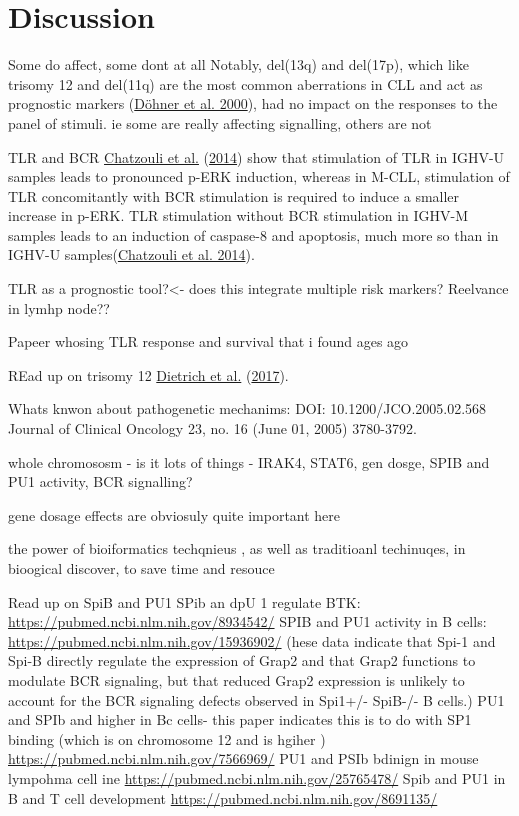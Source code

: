 \documentclass[11pt, a4paper, twosided]{book}
\begin{document}
\hypertarget{discussion-1}{%
\section{Discussion}\label{discussion-1}}

Some do affect, some dont at all
Notably, del(13q) and del(17p), which like trisomy 12 and del(11q) are the most common aberrations in CLL and act as prognostic markers (\protect\hyperlink{ref-Dohner2000}{Döhner et al. 2000}), had no impact on the responses to the panel of stimuli.
ie some are really affecting signalling, others are not

TLR and BCR
\protect\hyperlink{ref-Chatzouli2014}{Chatzouli et al.} (\protect\hyperlink{ref-Chatzouli2014}{2014}) show that stimulation of TLR in IGHV-U samples leads to pronounced p-ERK induction, whereas in M-CLL, stimulation of TLR concomitantly with BCR stimulation is required to induce a smaller increase in p-ERK. TLR stimulation without BCR stimulation in IGHV-M samples leads to an induction of caspase-8 and apoptosis, much more so than in IGHV-U samples(\protect\hyperlink{ref-Chatzouli2014}{Chatzouli et al. 2014}).

TLR as a prognostic tool?\textless- does this integrate multiple risk markers?
Reelvance in lymhp node??

Papeer whosing TLR response and survival that i found ages ago

REad up on trisomy 12
\protect\hyperlink{ref-JCIpaper}{Dietrich et al.} (\protect\hyperlink{ref-JCIpaper}{2017}).

Whats knwon about pathogenetic mechanims:
DOI: 10.1200/JCO.2005.02.568 Journal of Clinical Oncology 23, no. 16 (June 01, 2005) 3780-3792.

whole chromososm - is it lots of things - IRAK4, STAT6, gen dosge, SPIB and PU1 activity, BCR signalling?

gene dosage effects are obviosuly quite important here

the power of bioiformatics techqnieus , as well as traditioanl techinuqes, in bioogical discover, to save time and resouce

Read up on SpiB and PU1
SPib an dpU 1 regulate BTK: \url{https://pubmed.ncbi.nlm.nih.gov/8934542/}
SPIB and PU1 activity in B cells: \url{https://pubmed.ncbi.nlm.nih.gov/15936902/}
(hese data indicate that Spi-1 and Spi-B directly regulate the expression of Grap2 and that Grap2 functions to modulate BCR signaling, but that reduced Grap2 expression is unlikely to account for the BCR signaling defects observed in Spi1+/- SpiB-/- B cells.)
PU1 and SPIb and higher in Bc cells- this paper indicates this is to do with SP1 binding (which is on chromosome 12 and is hgiher ) \url{https://pubmed.ncbi.nlm.nih.gov/7566969/}
PU1 and PSIb bdinign in mouse lympohma cell ine \url{https://pubmed.ncbi.nlm.nih.gov/25765478/}
Spib and PU1 in B and T cell development \url{https://pubmed.ncbi.nlm.nih.gov/8691135/}
\end{document}
